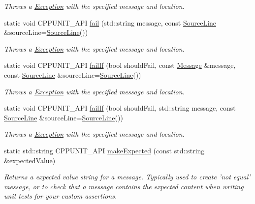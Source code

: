 \begin{DoxyCompactItemize}
\begin{DoxyCompactList}\small\item\em Throws a \hyperlink{class_exception}{Exception} with the specified message and location. \end{DoxyCompactList}\item 
static void C\+P\+P\+U\+N\+I\+T\+\_\+\+A\+P\+I \hyperlink{struct_asserter_a74825fc71909baa1286f9282ba5a2a54}{fail} (std\+::string message, const \hyperlink{class_source_line}{Source\+Line} \&source\+Line=\hyperlink{class_source_line}{Source\+Line}())
\begin{DoxyCompactList}\small\item\em Throws a \hyperlink{class_exception}{Exception} with the specified message and location. \end{DoxyCompactList}\item 
static void C\+P\+P\+U\+N\+I\+T\+\_\+\+A\+P\+I \hyperlink{struct_asserter_a425da14df34fad7e23a35456fce0eb2b}{fail\+If} (bool should\+Fail, const \hyperlink{class_message}{Message} \&message, const \hyperlink{class_source_line}{Source\+Line} \&source\+Line=\hyperlink{class_source_line}{Source\+Line}())
\begin{DoxyCompactList}\small\item\em Throws a \hyperlink{class_exception}{Exception} with the specified message and location. \end{DoxyCompactList}\item 
static void C\+P\+P\+U\+N\+I\+T\+\_\+\+A\+P\+I \hyperlink{struct_asserter_a71a4667a9d3f5d483f1a82157f715824}{fail\+If} (bool should\+Fail, std\+::string message, const \hyperlink{class_source_line}{Source\+Line} \&source\+Line=\hyperlink{class_source_line}{Source\+Line}())
\begin{DoxyCompactList}\small\item\em Throws a \hyperlink{class_exception}{Exception} with the specified message and location. \end{DoxyCompactList}\item 
static std\+::string C\+P\+P\+U\+N\+I\+T\+\_\+\+A\+P\+I \hyperlink{struct_asserter_adcbee7c01d58bfaee72cc984627e6432}{make\+Expected} (const std\+::string \&expected\+Value)
\begin{DoxyCompactList}\small\item\em Returns a expected value string for a message. Typically used to create 'not equal' message, or to check that a message contains the expected content when writing unit tests for your custom assertions. \end{DoxyCompactList}\item 

\end{DoxyCompactItemize}
